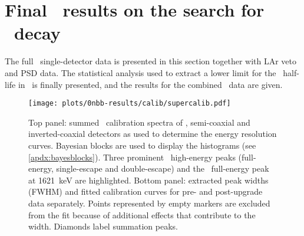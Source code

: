 \section{\texorpdfstring{Final \gerda\ results on the search for \onbb\ decay}{Final \gerda\ results on the search for 0nbb decay}}%
\label{sec:gerda:ana}

The full \phasetwo\ single-detector data is presented in this section together with LAr
veto and PSD data. The statistical analysis used to extract a lower limit for the \onbb\
half-life in \gesix\ is finally presented, and the results for the combined \gerda\ data
are given.

\begin{figure}
  \centering
  \texttt{[image: plots/0nbb-results/calib/supercalib.pdf]}
  \caption{%
    Top panel: summed \Th\ calibration spectra of \bege, semi-coaxial and inverted-coaxial
    detectors as used to determine the energy resolution curves. Bayesian blocks are used
    to display the histograms (see \cref{apdx:bayesblocks}). Three prominent \Tl\
    high-energy peaks (full-energy, single-escape and double-escape) and the \Bil\
    full-energy peak at 1621~keV are highlighted. Bottom panel: extracted peak widths
    (FWHM) and fitted calibration curves for pre- and post-upgrade data separately. Points
    represented by empty markers are excluded from the fit because of additional effects
    that contribute to the width. Diamonds label summation peaks.
  }\label{fig:gerda:calib-desc}
\end{figure}

